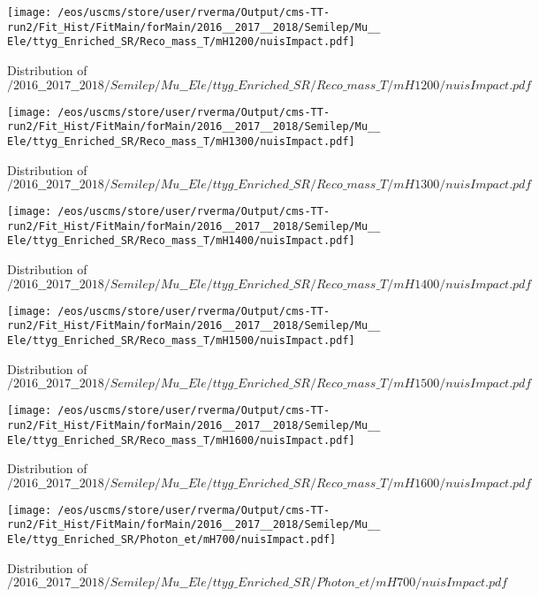 \begin{figure}
\centering
\texttt{[image: /eos/uscms/store/user/rverma/Output/cms-TT-run2/Fit\_Hist/FitMain/forMain/2016\_\_2017\_\_2018/Semilep/Mu\_\_Ele/ttyg\_Enriched\_SR/Reco\_mass\_T/mH1200/nuisImpact.pdf]}
\caption{Distribution of $/2016\_\_2017\_\_2018/Semilep/Mu\_\_Ele/ttyg\_Enriched\_SR/Reco\_mass\_T/mH1200/nuisImpact.pdf$}
\end{figure}

\begin{figure}
\centering
\texttt{[image: /eos/uscms/store/user/rverma/Output/cms-TT-run2/Fit\_Hist/FitMain/forMain/2016\_\_2017\_\_2018/Semilep/Mu\_\_Ele/ttyg\_Enriched\_SR/Reco\_mass\_T/mH1300/nuisImpact.pdf]}
\caption{Distribution of $/2016\_\_2017\_\_2018/Semilep/Mu\_\_Ele/ttyg\_Enriched\_SR/Reco\_mass\_T/mH1300/nuisImpact.pdf$}
\end{figure}

\begin{figure}
\centering
\texttt{[image: /eos/uscms/store/user/rverma/Output/cms-TT-run2/Fit\_Hist/FitMain/forMain/2016\_\_2017\_\_2018/Semilep/Mu\_\_Ele/ttyg\_Enriched\_SR/Reco\_mass\_T/mH1400/nuisImpact.pdf]}
\caption{Distribution of $/2016\_\_2017\_\_2018/Semilep/Mu\_\_Ele/ttyg\_Enriched\_SR/Reco\_mass\_T/mH1400/nuisImpact.pdf$}
\end{figure}

\begin{figure}
\centering
\texttt{[image: /eos/uscms/store/user/rverma/Output/cms-TT-run2/Fit\_Hist/FitMain/forMain/2016\_\_2017\_\_2018/Semilep/Mu\_\_Ele/ttyg\_Enriched\_SR/Reco\_mass\_T/mH1500/nuisImpact.pdf]}
\caption{Distribution of $/2016\_\_2017\_\_2018/Semilep/Mu\_\_Ele/ttyg\_Enriched\_SR/Reco\_mass\_T/mH1500/nuisImpact.pdf$}
\end{figure}

\begin{figure}
\centering
\texttt{[image: /eos/uscms/store/user/rverma/Output/cms-TT-run2/Fit\_Hist/FitMain/forMain/2016\_\_2017\_\_2018/Semilep/Mu\_\_Ele/ttyg\_Enriched\_SR/Reco\_mass\_T/mH1600/nuisImpact.pdf]}
\caption{Distribution of $/2016\_\_2017\_\_2018/Semilep/Mu\_\_Ele/ttyg\_Enriched\_SR/Reco\_mass\_T/mH1600/nuisImpact.pdf$}
\end{figure}

\begin{figure}
\centering
\texttt{[image: /eos/uscms/store/user/rverma/Output/cms-TT-run2/Fit\_Hist/FitMain/forMain/2016\_\_2017\_\_2018/Semilep/Mu\_\_Ele/ttyg\_Enriched\_SR/Photon\_et/mH700/nuisImpact.pdf]}
\caption{Distribution of $/2016\_\_2017\_\_2018/Semilep/Mu\_\_Ele/ttyg\_Enriched\_SR/Photon\_et/mH700/nuisImpact.pdf$}
\end{figure}

